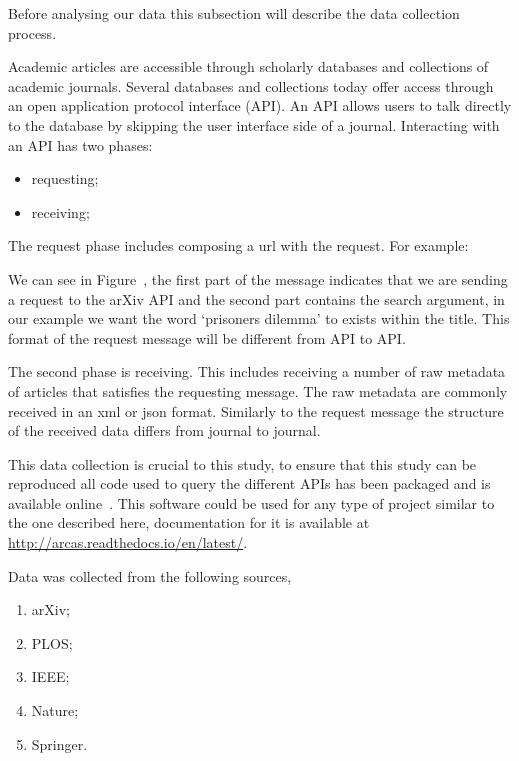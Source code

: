 \documentclass{article}
\begin{document}
Before analysing our data this subsection will describe the data collection
process.

Academic articles are accessible through scholarly databases and collections of
academic journals. Several databases and collections today offer access through
an open application protocol interface (API). An API allows users to talk
directly to the database by skipping the user interface side of a journal.
Interacting with an API has two phases:

\begin{itemize}
    \item requesting;
    \item receiving;
\end{itemize}

The request phase includes composing a url with the request. For example:

We can see in Figure~{}, the first part of the message indicates that we are 
sending a request to the arXiv API and the second part contains the search argument,
in our example we want the word `prisoners dilemma' to exists within the title.
This format of the request message will be different from API to API.

The second phase is receiving. This includes receiving a number of raw
metadata of articles that satisfies the requesting message. The raw metadata are 
commonly received in an xml or json format. Similarly to the request message
the structure of the received data differs from journal to journal.

This data collection is crucial to this study, to ensure that this study can be
reproduced all code used to query the different APIs has been packaged and is
available online~\cite{}. This software could be used for any type of project
similar to the one described here, documentation for it is available at
\url{http://arcas.readthedocs.io/en/latest/}.

Data was collected from the following sources,

\begin{enumerate}
        \item arXiv;
        \item PLOS;
        \item IEEE;
        \item Nature;
        \item Springer.
    \end{enumerate}
\end{document}
